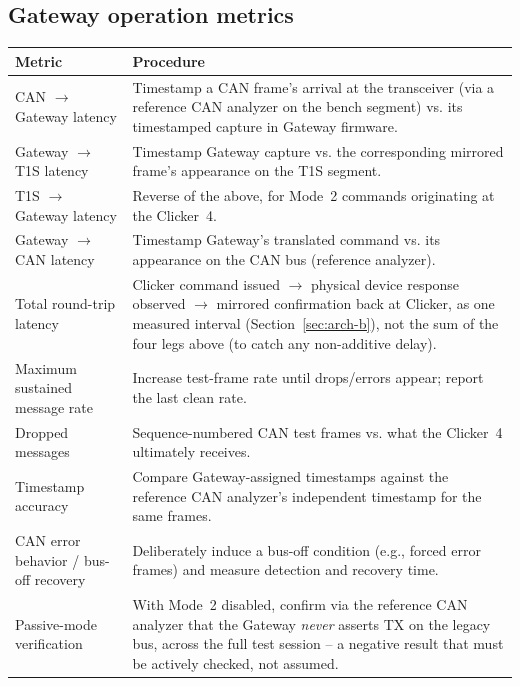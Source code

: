 \subsection{Gateway operation metrics}

\begin{center}
\small
\begin{tabularx}{\linewidth}{@{}p{3.6cm} X@{}}
\toprule
\textbf{Metric} & \textbf{Procedure} \\
\midrule
CAN $\rightarrow$ Gateway latency & Timestamp a CAN frame's arrival at the transceiver (via a reference CAN analyzer on the bench segment) vs. its timestamped capture in Gateway firmware. \\
Gateway $\rightarrow$ T1S latency & Timestamp Gateway capture vs. the corresponding mirrored frame's appearance on the T1S segment. \\
T1S $\rightarrow$ Gateway latency & Reverse of the above, for Mode~2 commands originating at the Clicker~4. \\
Gateway $\rightarrow$ CAN latency & Timestamp Gateway's translated command vs. its appearance on the CAN bus (reference analyzer). \\
Total round-trip latency & Clicker command issued $\rightarrow$ physical device response observed $\rightarrow$ mirrored confirmation back at Clicker, as one measured interval (Section~\ref{sec:arch-b}), not the sum of the four legs above (to catch any non-additive delay). \\
Maximum sustained message rate & Increase test-frame rate until drops/errors appear; report the last clean rate. \\
Dropped messages & Sequence-numbered CAN test frames vs. what the Clicker~4 ultimately receives. \\
Timestamp accuracy & Compare Gateway-assigned timestamps against the reference CAN analyzer's independent timestamp for the same frames. \\
CAN error behavior / bus-off recovery & Deliberately induce a bus-off condition (e.g., forced error frames) and measure detection and recovery time. \\
Passive-mode verification & With Mode~2 disabled, confirm via the reference CAN analyzer that the Gateway \emph{never} asserts TX on the legacy bus, across the full test session -- a negative result that must be actively checked, not assumed. \\
\bottomrule
\end{tabularx}
\end{center}


